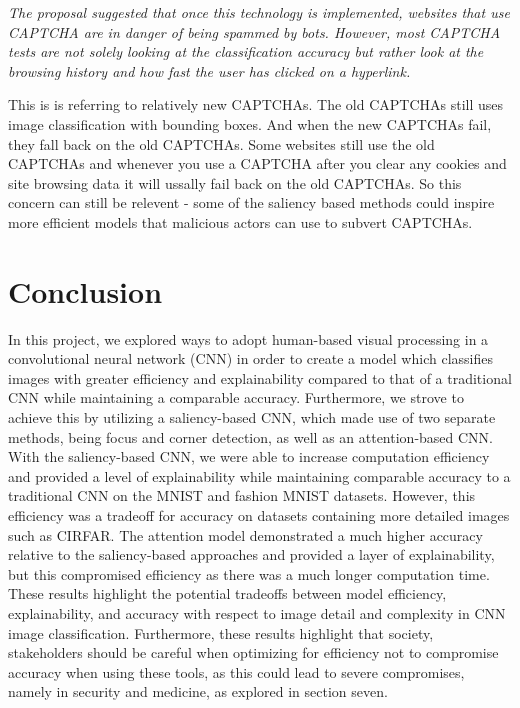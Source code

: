 \emph{The proposal suggested that once this technology is implemented, websites that use CAPTCHA are in danger of being spammed by bots. However, most CAPTCHA tests are not solely looking at the classification accuracy but rather look at the browsing history and how fast the user has clicked on a hyperlink.}

This is is referring to relatively new CAPTCHAs. The old CAPTCHAs still uses image classification with bounding boxes. And when the new CAPTCHAs fail, they fall back on the old CAPTCHAs. Some websites still use the old CAPTCHAs and whenever you use a CAPTCHA after you clear any cookies and site browsing data it will ussally fail back on the old CAPTCHAs. So this concern can still be relevent - some of the saliency based methods could inspire more efficient models that malicious actors can use to subvert CAPTCHAs. 
\section{Conclusion}

In this project, we explored ways to adopt human-based visual processing in a convolutional neural network (CNN) in order to create a model which classifies images with greater efficiency and explainability compared to that of a traditional CNN while maintaining a comparable accuracy. Furthermore, we strove to achieve this by utilizing a saliency-based CNN, which made use of two separate methods, being focus and corner detection, as well as an attention-based CNN. With the saliency-based CNN, we were able to increase computation efficiency and provided a level of explainability while maintaining comparable accuracy to a traditional CNN on the MNIST and fashion MNIST datasets. However, this efficiency was a tradeoff for accuracy on datasets containing more detailed images such as CIRFAR. The attention model demonstrated a much higher accuracy relative to the saliency-based approaches and provided a layer of explainability, but this compromised efficiency as there was a much longer computation time. These results highlight the potential tradeoffs between model efficiency, explainability, and accuracy with respect to image detail and complexity in CNN image classification. Furthermore, these results highlight that society, stakeholders should be careful when optimizing for efficiency not to compromise accuracy when using these tools, as this could lead to severe compromises, namely in security and medicine, as explored in section seven. 



